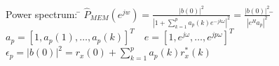 \begin{tabbing}
Power spectrum:  	\=  $\hat{P}_{MEM}(e^{jw}) =  \frac{|b(0)|^2}{\left| 1 + \sum\limits_{k=1}^{p} a_p(k)e^{-jk\omega}\right|^2} =
						\frac{|b(0)|^2}{\left|e^H a_p\right|^2}$
						\hspace{1cm} \= $a_p=[1,a_p(1),\ldots, a_p(k)]^T \quad e=[1,e^{j\omega},\ldots, e^{jp\omega}]^T $ \\
\>						$\epsilon_p = |b(0)|^2 = r_x(0) + \sum\limits_{k=1}^p a_p(k) r_x^*(k)$ \\
\end{tabbing}
